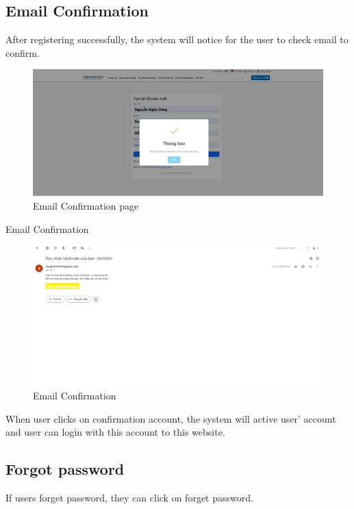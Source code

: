 \documentclass[../Main.tex]{subfiles}
\begin{document}
\subsection{Email Confirmation}

After registering successfully, the system will notice for the user to check email to confirm.

\begin{figure}[H]
    \centering
    \includegraphics[width=\textwidth]{Figure/Picture29.png}
    \caption{Email Confirmation page}
\end{figure}

Email Confirmation

\begin{figure}[H]
    \centering
    \includegraphics[width=\textwidth]{Figure/Picture30.png}
    \caption{Email Confirmation}
\end{figure}

When user clicks on confirmation account, the system will active user’ account and user can login with this account to this website.

\subsection{Forgot password}

If users forget password, they can click on forget password.
\end{document}
